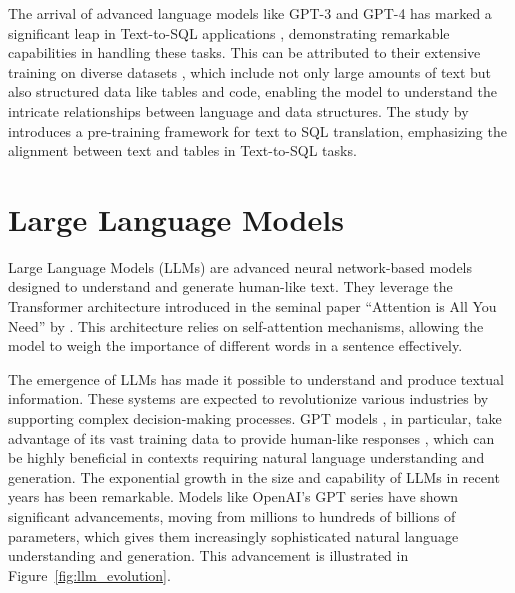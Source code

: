             The arrival of advanced language models like GPT-3 and GPT-4 \citep{OpenAImodels} has marked a significant leap in Text-to-SQL applications \citep{Singh2023}, demonstrating remarkable capabilities in handling these tasks. This can be attributed to their extensive training on diverse datasets \citep{Deng2021}, which include not only large amounts of text but also structured data like tables and code, enabling the model to understand the intricate relationships between language and data structures. The study by \citep{Deng2023} introduces a pre-training framework for text to SQL translation, emphasizing the alignment between text and tables in Text-to-SQL tasks.





    \section{Large Language Models}         

        Large Language Models (LLMs) are advanced neural network-based models designed to understand and generate human-like text. 
        They leverage the Transformer architecture introduced in the seminal paper \enquote{Attention is All You Need} by \citet{Vaswani2017}. 
        This architecture relies on self-attention mechanisms, allowing the model to weigh the importance of different words in a sentence effectively. 

        The emergence of LLMs has made it possible to understand and produce textual information. 
        These systems are expected to revolutionize various industries by supporting complex decision-making processes. GPT models \citep{OpenAI2023}, in particular, take advantage of its vast training data to provide human-like responses \citep{Mosser2024}, which can be highly beneficial in contexts requiring natural language understanding and generation. The exponential growth in the size and capability of LLMs in recent years has been remarkable. Models like OpenAI's GPT series have shown significant advancements, moving from millions to hundreds of billions of parameters, which gives them increasingly sophisticated natural language understanding and generation. This advancement is illustrated in Figure~\ref{fig:llm_evolution}.


